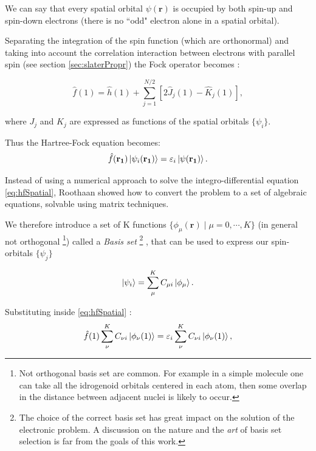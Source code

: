 \documentclass[a4paper,12pt]{article}
\begin{document}
We can say that every spatial orbital $\psi(\mathbf{r})$ is occupied by both spin-up and spin-down electrons (there is no ``odd" electron alone in a spatial orbital).

Separating the integration of the spin function (which are orthonormal) and taking into account the correlation interaction between electrons with parallel spin (see section \ref{sec:slaterPropr}) \cite[p.132-133]{Attila} the Fock operator becomes :

\begin{equation}
\hat{f}(1) = \hat{h}(1) +\sum_{j=1}^{N/2}[2\hat J_j(1)-\hat K_j(1)],
\end{equation}

where $J_j$ and $K_j$ are expressed as functions of the spatial orbitals $\{\psi_i\}$.

Thus the Hartree-Fock equation becomes:
\begin{equation}\label{eq:hfSpatial}
	\hat{f}(\mathbf{r_1}) \ket{\psi_i(\mathbf{r_1})} = \varepsilon_i \ket{\psi(\mathbf{r_1})}.
\end{equation}

Instead of using a numerical approach to solve the integro-differential equation \eqref{eq:hfSpatial}, Roothaan showed how to convert the problem to a set of algebraic equations, solvable using matrix techniques.

We therefore introduce a set of K functions $\{ \phi_{\mu}(\mathbf{r}) \mid \mu = 0,\cdots,K\}$ (in general not orthogonal \footnote{Not orthogonal basis set are common. For example in a simple molecule one can take all the idrogenoid orbitals centered in each atom, then some overlap in the distance between adjacent nuclei is likely to occur.}) called a \textit{Basis set} \footnote{ The choice of the correct basis set has great impact on the solution of the electronic problem. A discussion on the nature and the \textit{art} of basis set selection is far from the goals of this work.} , that can be used to express our spin-orbitals $\{\psi_j\}$

\begin{equation}\label{eq:coeffMatrix}
	\ket{\psi_i} = \sum_{\mu}^{K} C_{\mu i} \ket{\phi_{\mu}}.
\end{equation}

Substituting inside \eqref{eq:hfSpatial} :
\begin{equation}
	\hat{f}(1) \sum_{\nu}^{K} C_{\nu i} \ket{\phi_{\nu}(1)}  = \varepsilon_i \sum_{\nu}^{K} C_{\nu i} \ket{\phi_{\nu}(1)},
\end{equation}
\end{document}
